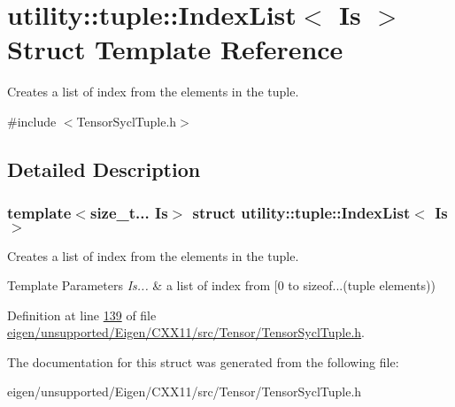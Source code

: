 \hypertarget{structutility_1_1tuple_1_1_index_list}{}\section{utility\+:\+:tuple\+:\+:Index\+List$<$ Is $>$ Struct Template Reference}
\label{structutility_1_1tuple_1_1_index_list}


Creates a list of index from the elements in the tuple.  




{\ttfamily \#include $<$Tensor\+Sycl\+Tuple.\+h$>$}



\subsection{Detailed Description}
\subsubsection*{template$<$size\+\_\+t... Is$>$\newline
struct utility\+::tuple\+::\+Index\+List$<$ Is $>$}

Creates a list of index from the elements in the tuple. 


\begin{DoxyTemplParams}{Template Parameters}
{\em Is...} & a list of index from \mbox{[}0 to sizeof...(tuple elements)) \\
\hline
\end{DoxyTemplParams}


Definition at line \hyperlink{eigen_2unsupported_2_eigen_2_c_x_x11_2src_2_tensor_2_tensor_sycl_tuple_8h_source_l00139}{139} of file \hyperlink{eigen_2unsupported_2_eigen_2_c_x_x11_2src_2_tensor_2_tensor_sycl_tuple_8h_source}{eigen/unsupported/\+Eigen/\+C\+X\+X11/src/\+Tensor/\+Tensor\+Sycl\+Tuple.\+h}.



The documentation for this struct was generated from the following file\+:\begin{DoxyCompactItemize}
\item 
eigen/unsupported/\+Eigen/\+C\+X\+X11/src/\+Tensor/\+Tensor\+Sycl\+Tuple.\+h\end{DoxyCompactItemize}
